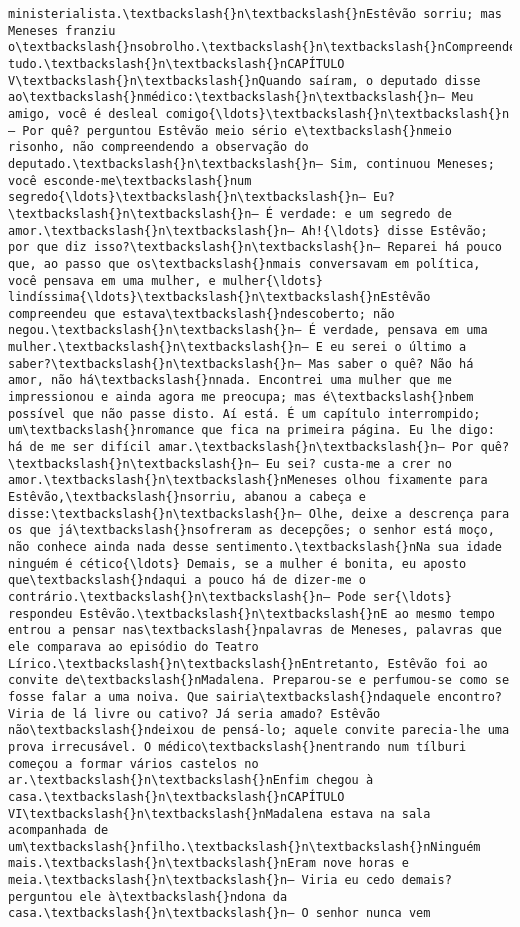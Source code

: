 \begin{Verbatim}[commandchars=\\\{\}]
ministerialista.\textbackslash{}n\textbackslash{}nEstêvão sorriu; mas Meneses franziu o\textbackslash{}nsobrolho.\textbackslash{}n\textbackslash{}nCompreendera tudo.\textbackslash{}n\textbackslash{}nCAPÍTULO V\textbackslash{}n\textbackslash{}nQuando saíram, o deputado disse ao\textbackslash{}nmédico:\textbackslash{}n\textbackslash{}n— Meu amigo, você é desleal comigo{\ldots}\textbackslash{}n\textbackslash{}n— Por quê? perguntou Estêvão meio sério e\textbackslash{}nmeio risonho, não compreendendo a observação do deputado.\textbackslash{}n\textbackslash{}n— Sim, continuou Meneses; você esconde-me\textbackslash{}num segredo{\ldots}\textbackslash{}n\textbackslash{}n— Eu?\textbackslash{}n\textbackslash{}n— É verdade: e um segredo de amor.\textbackslash{}n\textbackslash{}n— Ah!{\ldots} disse Estêvão; por que diz isso?\textbackslash{}n\textbackslash{}n— Reparei há pouco que, ao passo que os\textbackslash{}nmais conversavam em política, você pensava em uma mulher, e mulher{\ldots} lindíssima{\ldots}\textbackslash{}n\textbackslash{}nEstêvão compreendeu que estava\textbackslash{}ndescoberto; não negou.\textbackslash{}n\textbackslash{}n— É verdade, pensava em uma mulher.\textbackslash{}n\textbackslash{}n— E eu serei o último a saber?\textbackslash{}n\textbackslash{}n— Mas saber o quê? Não há amor, não há\textbackslash{}nnada. Encontrei uma mulher que me impressionou e ainda agora me preocupa; mas é\textbackslash{}nbem possível que não passe disto. Aí está. É um capítulo interrompido; um\textbackslash{}nromance que fica na primeira página. Eu lhe digo: há de me ser difícil amar.\textbackslash{}n\textbackslash{}n— Por quê?\textbackslash{}n\textbackslash{}n— Eu sei? custa-me a crer no amor.\textbackslash{}n\textbackslash{}nMeneses olhou fixamente para Estêvão,\textbackslash{}nsorriu, abanou a cabeça e disse:\textbackslash{}n\textbackslash{}n— Olhe, deixe a descrença para os que já\textbackslash{}nsofreram as decepções; o senhor está moço, não conhece ainda nada desse sentimento.\textbackslash{}nNa sua idade ninguém é cético{\ldots} Demais, se a mulher é bonita, eu aposto que\textbackslash{}ndaqui a pouco há de dizer-me o contrário.\textbackslash{}n\textbackslash{}n— Pode ser{\ldots} respondeu Estêvão.\textbackslash{}n\textbackslash{}nE ao mesmo tempo entrou a pensar nas\textbackslash{}npalavras de Meneses, palavras que ele comparava ao episódio do Teatro Lírico.\textbackslash{}n\textbackslash{}nEntretanto, Estêvão foi ao convite de\textbackslash{}nMadalena. Preparou-se e perfumou-se como se fosse falar a uma noiva. Que sairia\textbackslash{}ndaquele encontro? Viria de lá livre ou cativo? Já seria amado? Estêvão não\textbackslash{}ndeixou de pensá-lo; aquele convite parecia-lhe uma prova irrecusável. O médico\textbackslash{}nentrando num tílburi começou a formar vários castelos no ar.\textbackslash{}n\textbackslash{}nEnfim chegou à casa.\textbackslash{}n\textbackslash{}nCAPÍTULO VI\textbackslash{}n\textbackslash{}nMadalena estava na sala acompanhada de um\textbackslash{}nfilho.\textbackslash{}n\textbackslash{}nNinguém mais.\textbackslash{}n\textbackslash{}nEram nove horas e meia.\textbackslash{}n\textbackslash{}n— Viria eu cedo demais? perguntou ele à\textbackslash{}ndona da casa.\textbackslash{}n\textbackslash{}n— O senhor nunca vem 
\end{Verbatim}
